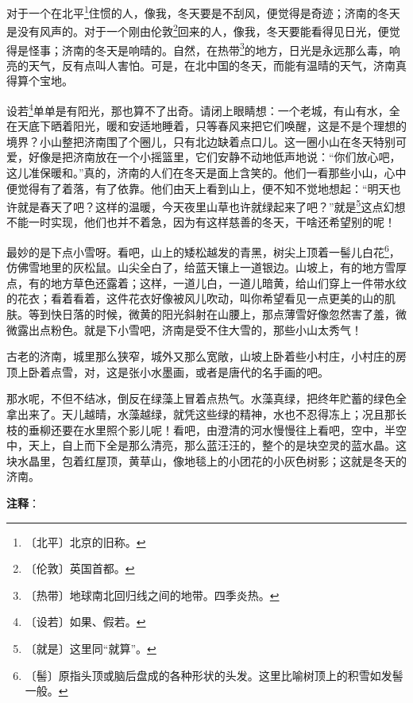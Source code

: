 \documentclass[12pt,UTF-8,openany]{ctexbook}
\begin{document}
\begin{large}
    
    对于一个在北平\footnote{〔北平〕北京的旧称。}住惯的人，像我，冬天要是不刮风，便觉得是奇迹；济南的冬天是没有风声的。对于一个刚由伦敦\footnote{〔伦敦〕英国首都。}回来的人，像我，冬天要能看得见日光，便觉得是怪事；济南的冬天是响晴的。自然，在热带\footnote{〔热带〕地球南北回归线之间的地带。四季炎热。}的地方，日光是永远那么毒，响亮的天气，反有点叫人害怕。可是，在北中国的冬天，而能有温晴的天气，济南真得算个宝地。
    
    设若\footnote{〔设若〕如果、假若。}单单是有阳光，那也算不了出奇。请闭上眼睛想：一个老城，有山有水，全在天底下晒着阳光，暖和安适地睡着，只等春风来把它们唤醒，这是不是个理想的境界？小山整把济南围了个圈儿，只有北边缺着点口儿。这一圈小山在冬天特别可爱，好像是把济南放在一个小摇篮里，它们安静不动地低声地说：“你们放心吧，这儿准保暖和。”真的，济南的人们在冬天是面上含笑的。他们一看那些小山，心中便觉得有了着落，有了依靠。他们由天上看到山上，便不知不觉地想起：“明天也许就是春天了吧？这样的温暖，今天夜里山草也许就绿起来了吧？”就是\footnote{〔就是〕这里同“就算”。}这点幻想不能一时实现，他们也并不着急，因为有这样慈善的冬天，干啥还希望别的呢！
    
    最妙的是下点小雪呀。看吧，山上的矮松越发的青黑，树尖上顶着一髻儿白花\footnote{〔髻〕原指头顶或脑后盘成的各种形状的头发。这里比喻树顶上的积雪如发髻一般。}，仿佛雪地里的灰松鼠。山尖全白了，给蓝天镶上一道银边。山坡上，有的地方雪厚点，有的地方草色还露着；这样，一道儿白，一道儿暗黄，给山们穿上一件带水纹的花衣；看着看着，这件花衣好像被风儿吹动，叫你希望看见一点更美的山的肌肤。等到快日落的时候，微黄的阳光斜射在山腰上，那点薄雪好像忽然害了羞，微微露出点粉色。就是下小雪吧，济南是受不住大雪的，那些小山太秀气！
    
    古老的济南，城里那么狭窄，城外又那么宽敞，山坡上卧着些小村庄，小村庄的房顶上卧着点雪，对，这是张小水墨画，或者是唐代的名手画的吧。
    
    那水呢，不但不结冰，倒反在绿藻上冒着点热气。水藻真绿，把终年贮蓄的绿色全拿出来了。天儿越晴，水藻越绿，就凭这些绿的精神，水也不忍得冻上；况且那长枝的垂柳还要在水里照个影儿呢！看吧，由澄清的河水慢慢往上看吧，空中，半空中，天上，自上而下全是那么清亮，那么蓝汪汪的，整个的是块空灵的蓝水晶。这块水晶里，包着红屋顶，黄草山，像地毯上的小团花的小灰色树影；这就是冬天的济南。
    
\end{large}


\newpage

\textbf{注释}：

\vspace{-1em}
\end{document}
